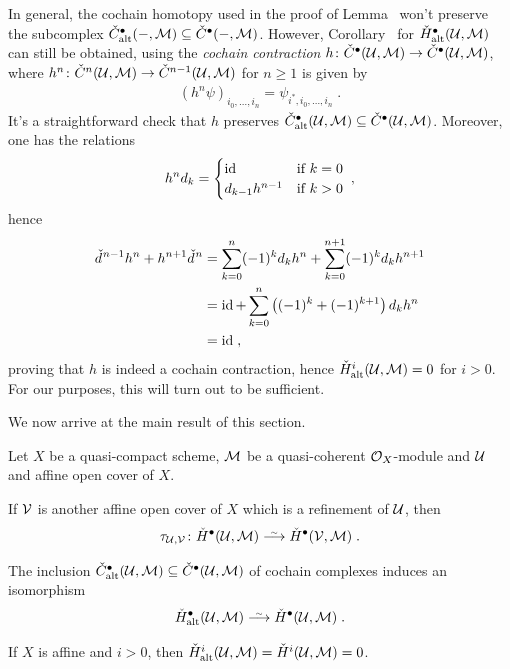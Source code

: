 \documentclass[a4paper,parskip=half,numbers=enddot, DIV=12]{scrreprt}
\begin{document}
\begin{rem}
	In general, the cochain homotopy used in the proof of Lemma~ won't preserve the subcomplex $\check{C}_{\mathrm{alt}}^\bullet (-,\mathcal{M})\subseteq\check{C}^\bullet (-,\mathcal{M})$. However, Corollary~ for $\check{H}_{\mathrm{alt}}^\bullet (\mathcal{U},\mathcal{M})$ can still be obtained, using the \emph{cochain contraction} $h\colon \check{C}^\bullet (\Uu,\Mm)\morphism\check{C}^\bullet (\Uu,\Mm)$, where $h^n\colon \check{C}^n(\Uu,\Mm)\morphism\check{C}^{n-1}(\Uu,\Mm)$ for $n\geq 1$ is given by
	\begin{align*}
		(h^n\psi)_{i_0,\ldots,i_n}=\psi_{i^*,i_0,\ldots,i_n}\;.
	\end{align*}
	It's a straightforward check that $h$ preserves $\check{C}_{\mathrm{alt}}^\bullet (\mathcal{U},\mathcal{M})\subseteq \check{C}^\bullet (\mathcal{U},\mathcal{M})$. Moreover, one has the relations
	\begin{align*}
		h^nd_k=\begin{cases}
			\operatorname{id} &\text{if }k=0\\
			d_{k-1}h^{n-1} & \text{if }k>0
		\end{cases}\;,
	\end{align*}
	hence
	\begin{align*}
		\check{d}\hspace{0.06125em}^{n-1}h^n+h^{n+1}\check{d}\hspace{0.06125em}^n&=\sum_{k=0}^{n}(-1)^kd_kh^n+\sum_{k=0}^{n+1}(-1)^kd_kh^{n+1}\\
		&=\operatorname{id}+\sum_{k=0}^{n}\left((-1)^k+(-1)^{k+1}\right)d_kh^n\\
		&=\operatorname{id}\;,
	\end{align*}
	proving that $h$ is indeed a cochain contraction, hence $\check{H}_{\mathrm{alt}}^i(\mathcal{U},\mathcal{M})=0$ for $i>0$. For our purposes, this will turn out to be sufficient.
\end{rem}
We now arrive at the main result of this section.
\begin{prop}
	 Let $X$ be a quasi-compact scheme, $\mathcal{M}$ be a quasi-coherent $\mathcal{O}_X$-module and $\mathcal{U}$ and affine open cover of $X$.
	\begin{alphanumerate}
		\item If $\mathcal{V}$ is another affine open cover of $X$ which is a refinement of $\mathcal{U}$, then
		\begin{align*}
			\tau_{\Uu,\Vv}\colon \check{H}^\bullet (\Uu,\Mm)\isomorphism\check{H}^\bullet (\Vv,\Mm)\;.
		\end{align*}
		\item The inclusion $\check{C}_{\mathrm{alt}}^\bullet (\mathcal{U},\mathcal{M})\subseteq \check{C}^\bullet (\mathcal{U},\mathcal{M})$ of cochain complexes induces an isomorphism
		\begin{align*}
			\check{H}_\alt^\bullet (\Uu,\Mm)\isomorphism\check{H}^\bullet (\Uu,\Mm)\;.
		\end{align*}
		\item If $X$ is affine and $i>0$, then $\check{H}_{\mathrm{alt}}^i(\mathcal{U},\mathcal{M})=\check{H}^i(\mathcal{U},\mathcal{M})=0$.
	\end{alphanumerate}
\end{prop}
\end{document}

